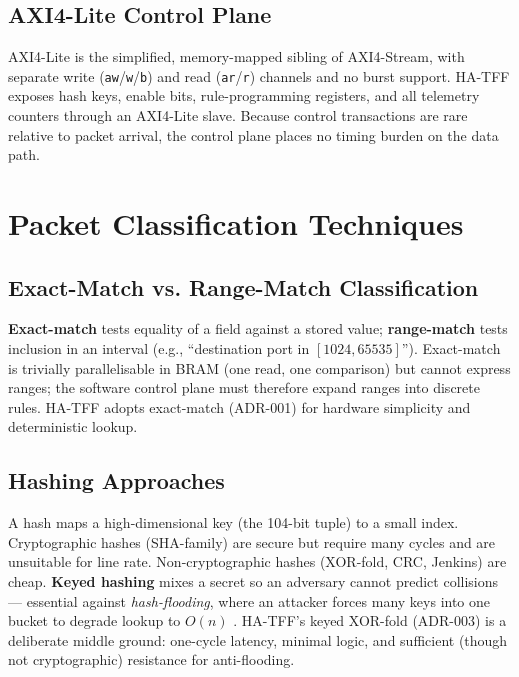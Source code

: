 \documentclass[12pt,twoside,openright]{book}
\begin{document}
\subsection{AXI4-Lite Control Plane}

AXI4-Lite is the simplified, memory-mapped sibling of AXI4-Stream, with separate write
(\texttt{aw}/\texttt{w}/\texttt{b}) and read (\texttt{ar}/\texttt{r}) channels and no burst
support. HA-TFF exposes hash keys, enable bits, rule-programming registers, and all telemetry
counters through an AXI4-Lite slave. Because control transactions are rare relative to packet
arrival, the control plane places no timing burden on the data path.

\section{Packet Classification Techniques}

\subsection{Exact-Match vs. Range-Match Classification}

\textbf{Exact-match} tests equality of a field against a stored value; \textbf{range-match} tests
inclusion in an interval (e.g., ``destination port in $[1024,65535]$''). Exact-match is trivially
parallelisable in BRAM (one read, one comparison) but cannot express ranges; the software control
plane must therefore expand ranges into discrete rules. HA-TFF adopts exact-match (ADR-001) for
hardware simplicity and deterministic lookup.

\subsection{Hashing Approaches}

A hash maps a high-dimensional key (the 104-bit tuple) to a small index. Cryptographic hashes
(SHA-family) are secure but require many cycles and are unsuitable for line rate. Non-cryptographic
hashes (XOR-fold, CRC, Jenkins) are cheap. \textbf{Keyed hashing} mixes a secret so an adversary
cannot predict collisions --- essential against \emph{hash-flooding}, where an attacker forces many
keys into one bucket to degrade lookup to $O(n)$ \cite{crosby2003,ferguson2003}. HA-TFF's keyed
XOR-fold (ADR-003) is a deliberate middle ground: one-cycle latency, minimal logic, and sufficient
(though not cryptographic) resistance for anti-flooding.
\end{document}
